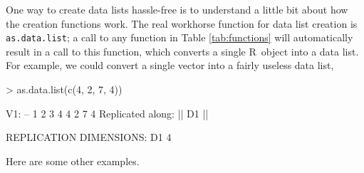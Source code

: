 \documentclass{article}
\newcommand{\R}{{\sf R}}
\newcommand{\code}[1]{\texttt{#1}}
\numberwithin{exercise}{section}
\begin{document}
One way to create data lists hassle-free is to understand a little bit about how the creation functions work.  The real workhorse function for data list creation is \code{as.data.list}; a call to any function in Table \ref{tab:functions} will automatically result in a call to this function, which converts a single \R\ object into a data list.  For example, we could convert a single vector into a fairly useless data list,
\begin{Schunk}
\begin{Sinput}
> as.data.list(c(4, 2, 7, 4))
\end{Sinput}
\begin{Soutput}
V1:
--
1 2 3 4 
4 2 7 4 
Replicated along:  || D1 || 


REPLICATION DIMENSIONS: 
D1 
 4 
\end{Soutput}
\end{Schunk}
\noindent Here are some other examples.
\end{document}
